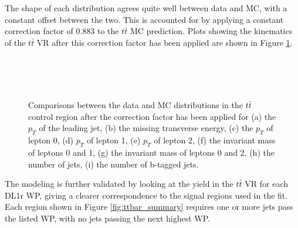 The shape of each distribution agrees quite well between data and MC, with a constant offset between the two. This is accounted for by applying a constant correction factor of 0.883 to the $t\bar{t}$ MC prediction. Plots showing the kinematics of the $t\bar{t}$ VR after this correction factor has been applied are shown in Figure \ref{fig:ttbar_withScale}.

\begin{figure}[H] 
    \centering
    \\                                     
    \\                                        
    \\                             
    \caption{Comparisons between the data and MC distributions in the $t\bar{t}$ control region after the correction factor has been applied for (a) the $p_T$ of the leading jet, (b) the missing transverse energy, (c) the $p_T$ of lepton 0, (d) $p_T$ of lepton 1, (e) $p_T$ of lepton 2, (f) the invariant mass of leptons 0 and 1, (g) the invariant mass of leptons 0 and 2, (h) the number of jets, (i) the number of b-tagged jets.}                                                                   
     \label{fig:ttbar_withScale}
\end{figure}

The modeling is further validated by looking at the yield in the $t\bar{t}$ VR for each DL1r WP, giving a clearer correspondence to the signal regions used in the fit. Each region shown in Figure \ref{fig:ttbar_summary} requires one or more jets pass the listed WP, with no jets passing the next highest WP.

